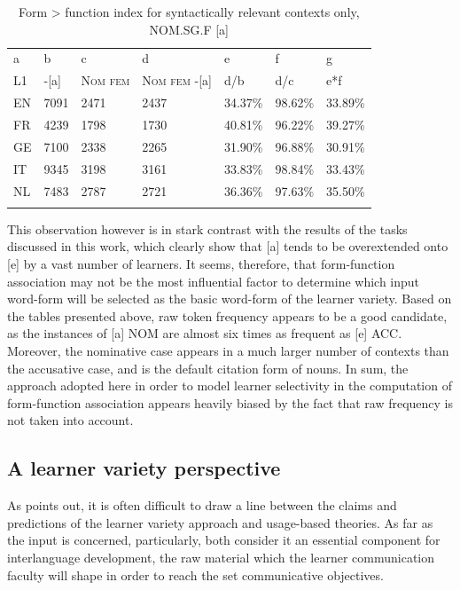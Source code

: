 \begin{table}[]
    \centering
    \begin{tabularx}{\textwidth}{XXXXXXX}
        \lsptoprule
        a & b & c & d & e & f & g\\
        L1 & {}-[a] & \textsc{Nom} \textsc{fem} & \textsc{Nom} \textsc{fem} -[a] & d/b & d/c & e*f\\
        EN & 7091 & 2471 & 2437 & 34.37\% & 98.62\% & 33.89\%\\
        FR & 4239 & 1798 & 1730 & 40.81\% & 96.22\% & 39.27\%\\
        GE & 7100 & 2338 & 2265 & 31.90\% & 96.88\% & 30.91\%\\
        IT & 9345 & 3198 & 3161 & 33.83\% & 98.84\% & 33.43\%\\
        NL & 7483 & 2787 & 2721 & 36.36\% & 97.63\% & 35.50\%\\
        \lspbottomrule
    \end{tabularx}
    \caption{Form > function index for syntactically relevant contexts only, NOM.SG.F [a]}
    \label{tab:08:2}
\end{table}

This observation however is in stark contrast with the results of the tasks discussed in this work, which clearly show that [a] tends to be overextended onto [e] by a vast number of learners. It seems, therefore, that form-function association may not be the most influential factor to determine which input word-form will be selected as the basic word-form of the learner variety. Based on the tables presented above, raw token frequency appears to be a good candidate, as the instances of [a] NOM are almost six times as frequent as [e] ACC. Moreover, the nominative case appears in a much larger number of contexts than the accusative case, and is the default citation form of nouns. In sum, the approach adopted here in order to model learner selectivity in the computation of form-function association appears heavily biased by the fact that raw frequency is not taken into account. 

\subsection{A learner variety perspective}\label{sec:08:1.3}

As \citet{Dimroth2018} points out, it is often difficult to draw a line between the claims and predictions of the learner variety approach and usage-based theories. As far as the input is concerned, particularly, both consider it an essential component for interlanguage development, the raw material which the learner communication faculty will shape in order to reach the set communicative objectives.

